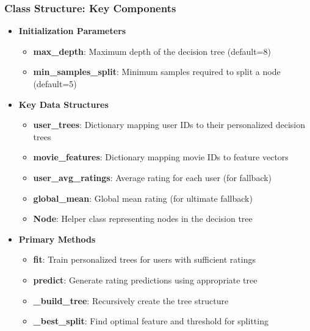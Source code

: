\documentclass{beamer}
\begin{document}
\begin{frame}
\frametitle{Class Structure: Key Components}

\begin{itemize}
    \item \textbf{Initialization Parameters}
    \begin{itemize}
        \item \textbf{max\_depth}: Maximum depth of the decision tree (default=8)
        \item \textbf{min\_samples\_split}: Minimum samples required to split a node (default=5)
    \end{itemize}
    
    \item \textbf{Key Data Structures}
    \begin{itemize}
        \item \textbf{user\_trees}: Dictionary mapping user IDs to their personalized decision trees
        \item \textbf{movie\_features}: Dictionary mapping movie IDs to feature vectors
        \item \textbf{user\_avg\_ratings}: Average rating for each user (for fallback)
        \item \textbf{global\_mean}: Global mean rating (for ultimate fallback)
        \item \textbf{Node}: Helper class representing nodes in the decision tree
    \end{itemize}
    
    \item \textbf{Primary Methods}
    \begin{itemize}
        \item \textbf{fit}: Train personalized trees for users with sufficient ratings
        \item \textbf{predict}: Generate rating predictions using appropriate tree
        \item \textbf{\_build\_tree}: Recursively create the tree structure
        \item \textbf{\_best\_split}: Find optimal feature and threshold for splitting
    \end{itemize}
\end{itemize}
\end{frame}
\end{document}
